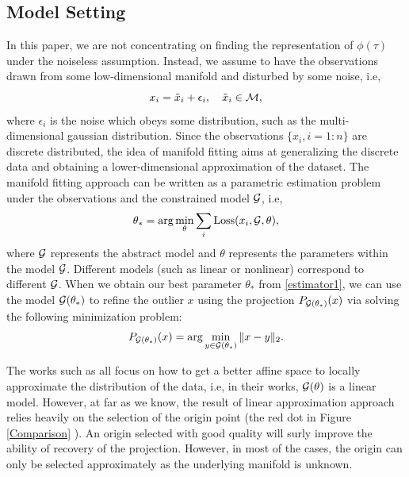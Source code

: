 \documentclass{article}
\theoremstyle{remark}
\begin{document}
\subsection{Model Setting}
In this paper, we are not concentrating on finding the representation of $\phi(\tau)$ under the noiseless assumption. Instead, we assume to have the observations drawn from some low-dimensional manifold and disturbed by some noise, i.e, 
\[
x_i = \tilde{x}_i+\epsilon_i, \quad \tilde{x}_i \in \cal M,
\]
where $\epsilon_i$ is the noise which obeys some distribution, such as the multi-dimensional gaussian distribution.
Since the observations $\{x_i, i=1:n\}$ are discrete distributed, the idea of manifold fitting aims at generalizing the discrete data and obtaining a lower-dimensional approximation of the dataset. The manifold fitting approach can be written as a parametric estimation problem under the observations and the constrained model $\cal G$, i.e,
\begin{equation}\label{estimator1}
 \theta_* =\arg \min_\theta  \sum_i {\rm Loss}(x_i, {\cal G}, \theta ),
\end{equation}
where $\cal G$ represents the abstract model and $\theta$ represents the parameters within the model $\cal G$. Different models (such as linear or nonlinear) correspond to different $\cal G$. When we obtain our best parameter $\theta_*$ from \eqref{estimator1}, we can use the model ${\cal G}(\theta_*)$ to refine the outlier $x$ using the projection $P_{{\cal G}(\theta_*) }(x)$ via solving the following minimization problem:
\[
P_{{\cal G}(\theta_*) }(x) = \arg \min_{y\in {\cal G}(\theta_*) } \|x-y\|_2.
\]
 
The works such as \cite{genovese2014nonparametric,ozertem2011locally} all focus on how to get a better affine space to locally approximate the distribution of the data, i.e, in their works, ${\cal G}(\theta)$ is a linear model. However, at far as we know, the result of linear approximation approach relies heavily on the selection of the origin point (the red dot in Figure \ref{Comparison} ). An origin selected with good quality will surly improve the ability of recovery of the projection. However, in most of the cases, the origin can only be selected approximately as the underlying manifold is unknown.
\end{document}
